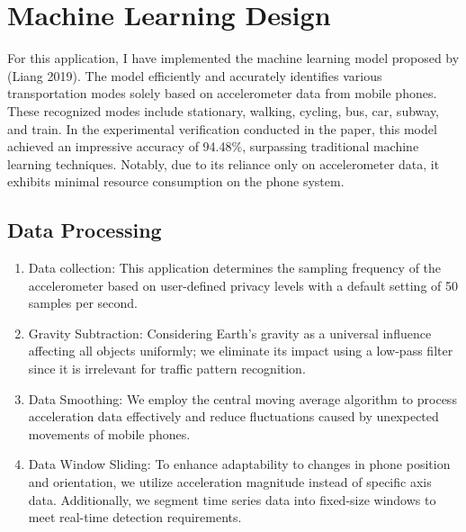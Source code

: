\documentclass[12pt,two side]{report}
\begin{document}
\section{Machine Learning Design}
For this application, I have implemented the machine learning model proposed by (Liang 2019)\cite{liang2019deep}. The model efficiently and accurately identifies various transportation modes solely based on accelerometer data from mobile phones. These recognized modes include stationary, walking, cycling, bus, car, subway, and train. In the experimental verification conducted in the paper, this model achieved an impressive accuracy of 94.48\%\cite{liang2019deep}, surpassing traditional machine learning techniques. Notably, due to its reliance only on accelerometer data, it exhibits minimal resource consumption on the phone system.

\subsection{Data Processing}
\begin{enumerate}
    \item Data collection: This application determines the sampling frequency of the accelerometer based on user-defined privacy levels with a default setting of 50 samples per second.
    \item Gravity Subtraction: Considering Earth's gravity as a universal influence affecting all objects uniformly; we eliminate its impact using a low-pass filter since it is irrelevant for traffic pattern recognition.
    \item Data Smoothing: We employ the central moving average algorithm to process acceleration data effectively and reduce fluctuations caused by unexpected movements of mobile phones.
    \item Data Window Sliding: To enhance adaptability to changes in phone position and orientation, we utilize acceleration magnitude instead of specific axis data. Additionally, we segment time series data into fixed-size windows to meet real-time detection requirements.
\end{enumerate}
\end{document}
